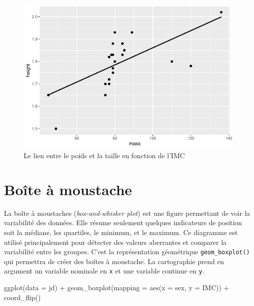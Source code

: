 \documentclass[
]{book}
\newenvironment{Shaded}{}{}
\newcommand{\AttributeTok}[1]{#1}
\newcommand{\FunctionTok}[1]{#1}
\newcommand{\NormalTok}[1]{#1}
\newcommand{\SpecialCharTok}[1]{#1}
\begin{document}
\begin{figure}

{\centering \includegraphics[width=0.75\linewidth,height=0.75\textheight]{07-Visualiser_files/figure-latex/diagdisp3-1} 

}

\caption{Le lien entre le poids et la taille en fonction de l'IMC}\label{fig:diagdisp3}
\end{figure}

\hypertarget{bouxeete-uxe0-moustache}{%
\section{Boîte à moustache}\label{bouxeete-uxe0-moustache}}

La boîte à moustaches (\emph{box-and-whisker plot}) est une figure permettant de voir la variabilité des données. Elle résume seulement quelques indicateurs de position soit la médiane, les quartiles, le minimum, et le maximum. Ce diagramme est utilisé principalement pour détecter des valeurs aberrantes et comparer la variabilité entre les groupes. C'est la représentation géométrique \texttt{geom\_boxplot()} qui permettra de créer des boîtes à moustache. La cartographie prend en argument un variable nominale en \texttt{x} et une variable continue en \texttt{y}.

\begin{Shaded}
\begin{Highlighting}[]
\FunctionTok{ggplot}\NormalTok{(}\AttributeTok{data =}\NormalTok{ jd) }\SpecialCharTok{+} 
  \FunctionTok{geom\_boxplot}\NormalTok{(}\AttributeTok{mapping =} \FunctionTok{aes}\NormalTok{(}\AttributeTok{x =}\NormalTok{ sex, }\AttributeTok{y =}\NormalTok{ IMC)) }\SpecialCharTok{+}
  \FunctionTok{coord\_flip}\NormalTok{()}
\end{Highlighting}
\end{Shaded}
\end{document}
